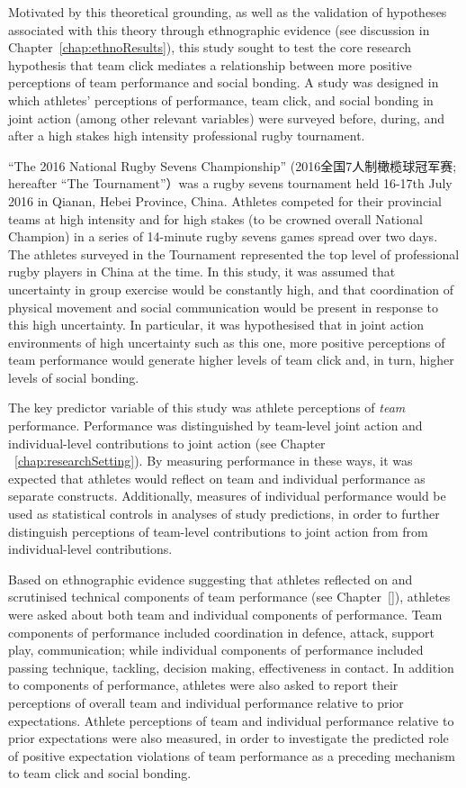 \begin{CJK}{UTF8}{gbsn}
Motivated by this theoretical grounding, as well as the validation of hypotheses associated with this theory through ethnographic evidence  (see discussion in Chapter~\ref{chap:ethnoResults}),  this study sought to test the core research hypothesis that team click mediates a relationship between more positive perceptions of team performance and social bonding.  A study was designed in which athletes' perceptions of performance, team click, and social bonding in joint action (among other relevant variables) were surveyed before, during, and after a high stakes high intensity professional rugby tournament.

``The 2016 National Rugby Sevens Championship'' (2016全国7人制橄榄球冠军赛; hereafter ``The Tournament''）was a rugby sevens tournament held 16-17th July 2016 in Qianan, Hebei Province, China.  Athletes competed for their provincial teams at high intensity and for high stakes (to be crowned overall National Champion) in a series of 14-minute rugby sevens games spread over two days.  The athletes surveyed in the Tournament represented the top level of professional rugby players in China at the time.  In this study, it was assumed that uncertainty in group exercise would be constantly high, and that coordination of physical movement and social communication would be present in response to this high uncertainty.  In particular, it was hypothesised that in joint action environments of high uncertainty such as this one, more positive perceptions of team performance would generate higher levels of team click and, in turn, higher levels of social bonding.

The key predictor variable of this study was athlete perceptions of \textit{team} performance.  Performance was distinguished by team-level joint action and individual-level contributions to joint action (see Chapter ~\ref{chap:researchSetting}).  By measuring performance in these ways, it was expected that athletes would reflect on team and individual performance as separate constructs.  Additionally, measures of individual performance would be used as statistical controls in analyses of study predictions, in order to further distinguish perceptions of team-level contributions to joint action from from individual-level contributions.

 Based on ethnographic evidence suggesting that athletes reflected on and scrutinised technical components of team performance (see Chapter~\ref{}), athletes were asked about both team and individual components of performance.  Team components of performance included coordination in defence, attack, support play, communication; while individual components of performance included passing technique, tackling, decision making, effectiveness in contact.  In addition to components of performance, athletes were also asked to report their perceptions of overall team and individual performance relative to prior expectations.  Athlete perceptions of team and individual performance relative to prior expectations were also measured, in order to investigate the predicted role of positive expectation violations of team performance as a preceding mechanism to team click and social bonding.


\end{CJK}

